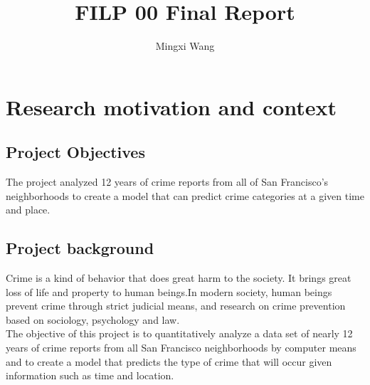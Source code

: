 \documentclass{amsart}
\begin{document}
%
%
\title[Report]{FILP 00 Final Report}%

\author{Mingxi Wang}
\address[A.~1]{School of Computer Science,\\ 
Jilin University, ChangChun 130012, China}%


%
\date{\gitAuthorDate}%




\maketitle
\tableofcontents

\newpage

%
\section{Research motivation and context}



\subsection{Project Objectives}
The project analyzed 12 years of crime reports from all of San Francisco's neighborhoods to create a model that can predict crime categories at a given time and place.\\

\subsection{Project background}
Crime is a kind of behavior that does great harm to the society. It brings great loss of life and property to human beings.In modern society, human beings prevent crime through strict judicial means, and research on crime prevention based on sociology, psychology and law.\\

\hspace*{0.6cm}The objective of this project is to quantitatively analyze a data set of nearly 12 years of crime reports from all San Francisco neighborhoods by computer means and to create a model that predicts the type of crime that will occur given information such as time and location.\\
\end{document}
